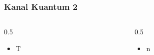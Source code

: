 \begin{frame}
    \frametitle{Kanal Kuantum 2}
  \begin{columns} %
    \begin{column}{0.5\textwidth}\vspace{-0.5cm}
      \justifying %
      \small %
        \begin{itemize}
            \item T
                
        \end{itemize}
    \end{column}
    
    \begin{column}{0.5\textwidth}\vspace{-0.5cm} %
            \justifying %
      \small %
        \begin{itemize}
            \item n
        \end{itemize}
    \end{column}
  \end{columns}
\end{frame}